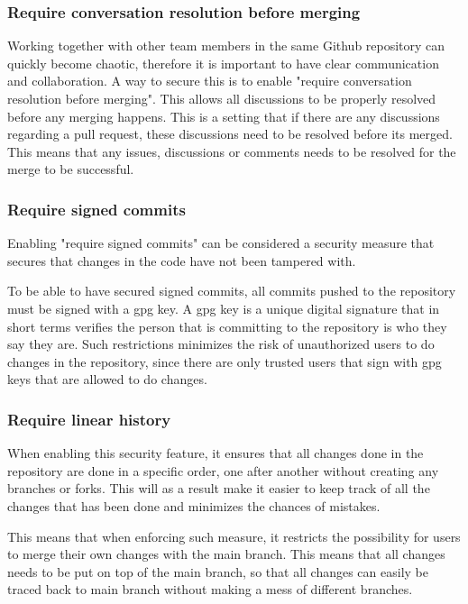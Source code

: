 \subsubsection{Require conversation resolution before merging}
Working together with other team members in the same Github repository can quickly become chaotic, therefore it is important to have clear communication and collaboration. A way to secure this is to enable "require conversation resolution before merging". This allows all discussions to be properly resolved before any merging happens. This is a setting that if there are any discussions regarding a pull request, these discussions need to be resolved before its merged. This means that any issues, discussions or comments needs to be resolved for the merge to be successful. 
\\
\subsubsection{Require signed commits}
Enabling "require signed commits" can be considered a security measure that secures that changes in the code have not been tampered with. 

To be able to have secured signed commits, all commits pushed to the repository must be signed with a \acrlong{gpg} key. A \acrshort{gpg} key is  a unique digital signature that in short terms verifies the person that is committing to the repository is who they say they are. 
Such restrictions minimizes the risk of unauthorized users to do changes in the repository, since there are only trusted users that sign with \acrshort{gpg} keys that are allowed to do changes. 

\subsubsection{Require linear history}
When enabling this security feature, it ensures that all changes done in the repository are done in a specific order, one after another without creating any branches or forks. This will as a result make it easier to keep track of all the changes that has been done and minimizes the chances of mistakes. 

This means that when enforcing such measure, it restricts the possibility for users to merge their own changes with the main branch. This means that all changes needs to be put on top of the main branch, so that all changes can easily be traced back to main branch without making a mess of different branches. 

